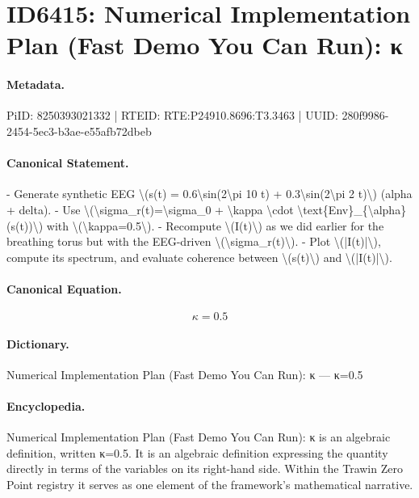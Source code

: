 \section*{ID6415: Numerical Implementation Plan (Fast Demo You Can Run): κ}
\paragraph{Metadata.}
PiID: 8250393021332 | RTEID: RTE:P24910.8696:T3.3463 | UUID: 280f9986-2454-5ec3-b3ae-e55afb72dbeb

\paragraph{Canonical Statement.}
- Generate synthetic EEG \textbackslash{}(s(t) = 0.6\textbackslash{}sin(2\textbackslash{}pi 10 t) + 0.3\textbackslash{}sin(2\textbackslash{}pi 2 t)\textbackslash{}) (alpha + delta). - Use \textbackslash{}(\textbackslash{}sigma\_r(t)=\textbackslash{}sigma\_0 + \textbackslash{}kappa \textbackslash{}cdot \textbackslash{}text\{Env\}\_\{\textbackslash{}alpha\}(s(t))\textbackslash{}) with \textbackslash{}(\textbackslash{}kappa=0.5\textbackslash{}). - Recompute \textbackslash{}(I(t)\textbackslash{}) as we did earlier for the breathing torus but with the EEG-driven \textbackslash{}(\textbackslash{}sigma\_r(t)\textbackslash{}). - Plot \textbackslash{}(|I(t)|\textbackslash{}), compute its spectrum, and evaluate coherence between \textbackslash{}(s(t)\textbackslash{}) and \textbackslash{}(|I(t)|\textbackslash{}).

\paragraph{Canonical Equation.}
\[
\kappa=0.5
\]

\paragraph{Dictionary.}
Numerical Implementation Plan (Fast Demo You Can Run): κ — κ=0.5

\paragraph{Encyclopedia.}
Numerical Implementation Plan (Fast Demo You Can Run): κ is an algebraic definition, written κ=0.5. It is an algebraic definition expressing the quantity directly in terms of the variables on its right-hand side. Within the Trawin Zero Point registry it serves as one element of the framework's mathematical narrative.
